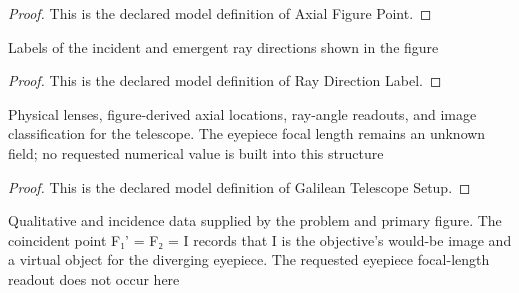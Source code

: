 \begin{proof}
  This is the declared model definition of Axial Figure Point.
\end{proof}
\begin{definition}
  \label{def:physics:phyx-mini-0111:phyxminiproblems-problemphyxmini0111-raydirectionlabel}
  Labels of the incident and emergent ray directions shown in the figure
\end{definition}
\begin{proof}
  This is the declared model definition of Ray Direction Label.
\end{proof}
\begin{definition}
  \label{def:physics:phyx-mini-0111:phyxminiproblems-problemphyxmini0111-galileantelescopesetup}
  Physical lenses, figure-derived axial locations, ray-angle readouts, and image classification for the telescope. The eyepiece focal length remains an unknown field; no requested numerical value is built into this structure
\end{definition}
\begin{proof}
  This is the declared model definition of Galilean Telescope Setup.
\end{proof}
\begin{definition}
  \label{def:physics:phyx-mini-0111:phyxminiproblems-problemphyxmini0111-matchesgalileantelescopefigure}
  Qualitative and incidence data supplied by the problem and primary figure. The coincident point F₁' = F₂ = I records that I is the objective's would-be image and a virtual object for the diverging eyepiece. The requested eyepiece focal-length readout does not occur here
\end{definition}
